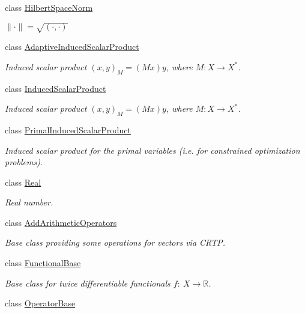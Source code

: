 \begin{DoxyCompactItemize}
class \hyperlink{classSpacy_1_1HilbertSpaceNorm}{Hilbert\-Space\-Norm}
\begin{DoxyCompactList}\small\item\em $ \|\cdot\|=\sqrt{(\cdot,\cdot)} $ \end{DoxyCompactList}\item 
class \hyperlink{classSpacy_1_1AdaptiveInducedScalarProduct}{Adaptive\-Induced\-Scalar\-Product}
\begin{DoxyCompactList}\small\item\em Induced scalar product $(x,y)_M = (Mx)y$, where $M:X\rightarrow X^*$. \end{DoxyCompactList}\item 
class \hyperlink{classSpacy_1_1InducedScalarProduct}{Induced\-Scalar\-Product}
\begin{DoxyCompactList}\small\item\em Induced scalar product $(x,y)_M = (Mx)y$, where $M:X\rightarrow X^*$. \end{DoxyCompactList}\item 
class \hyperlink{classSpacy_1_1PrimalInducedScalarProduct}{Primal\-Induced\-Scalar\-Product}
\begin{DoxyCompactList}\small\item\em Induced scalar product for the primal variables (i.\-e. for constrained optimization problems). \end{DoxyCompactList}\item 
class \hyperlink{classSpacy_1_1Real}{Real}
\begin{DoxyCompactList}\small\item\em Real number. \end{DoxyCompactList}\item 
class \hyperlink{classSpacy_1_1AddArithmeticOperators}{Add\-Arithmetic\-Operators}
\begin{DoxyCompactList}\small\item\em Base class providing some operations for vectors via C\-R\-T\-P. \end{DoxyCompactList}\item 
class \hyperlink{classSpacy_1_1FunctionalBase}{Functional\-Base}
\begin{DoxyCompactList}\small\item\em Base class for twice differentiable functionals $ f:\ X\rightarrow \mathbb{R}$. \end{DoxyCompactList}\item 
class \hyperlink{classSpacy_1_1OperatorBase}{Operator\-Base}

\end{DoxyCompactItemize}
